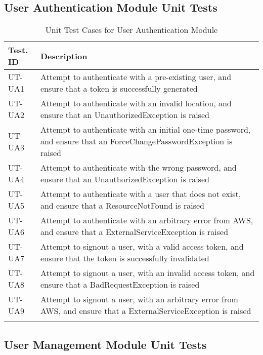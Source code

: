 \documentclass[12pt, titlepage]{article}
\begin{document}
\subsection{User Authentication Module Unit Tests}

\begin{longtable}{|m{2cm}|m{10cm}|}
  \hline
  \textbf{Test. ID} & \textbf{Description} \\ \hline
  UT-UA1 & Attempt to authenticate with a pre-existing user, and
  ensure that a token is successfully generated\\ \hline
  UT-UA2 & Attempt to authenticate with an invalid location, and
  ensure that an UnauthorizedException is raised\\ \hline
  UT-UA3 & Attempt to authenticate with an initial one-time
  password, and ensure that an ForceChangePasswordException is raised
  \\ \hline
  UT-UA4 & Attempt to authenticate with the wrong password, and
  ensure that an UnauthorizedException is raised\\ \hline
  UT-UA5 & Attempt to authenticate with a user that does not exist,
  and ensure that a ResourceNotFound is raised\\ \hline
  UT-UA6 & Attempt to authenticate with an arbitrary error from AWS,
  and ensure that a ExternalServiceException is raised\\ \hline
  UT-UA7 & Attempt to signout a user, with a valid access token, and
  ensure that the token is successfully invalidated\\ \hline
  UT-UA8 & Attempt to signout a user, with an invalid access token,
  and ensure that a BadRequestException is raised\\ \hline
  UT-UA9 & Attempt to signout a user, with an arbitrary error from
  AWS, and ensure that a ExternalServiceException is raised\\ \hline
  \caption{Unit Test Cases for User Authentication Module}
\end{longtable}

\subsection{User Management Module Unit Tests}
\end{document}
